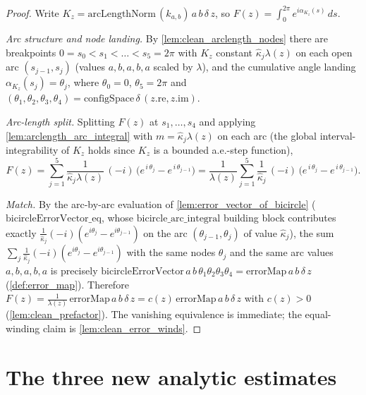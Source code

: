 \begin{proof}
  \leanok
  Write $K_z=\mathrm{arcLengthNorm}\,(k_{a,b})\,a\,b\,\delta\,z$, so
  $F(z)=\int_0^{2\pi}e^{i\alpha_{K_z}(s)}\,ds$.

  \emph{Arc structure and node landing.} By \cref{lem:clean_arclength_nodes} there
  are breakpoints $0=s_0<s_1<\dots<s_5=2\pi$ with $K_z$ constant $\hat\kappa_j\lambda(z)$
  on each open arc $(s_{j-1},s_j)$ (values $a,b,a,b,a$ scaled by $\lambda$), and the
  cumulative angle landing $\alpha_{K_z}(s_j)=\theta_j$, where $\theta_0=0$,
  $\theta_5=2\pi$ and $(\theta_1,\theta_2,\theta_3,\theta_4)=\mathrm{configSpace}\,\delta\,(z.\mathrm{re},z.\mathrm{im})$.

  \emph{Arc-length split.} Splitting $F(z)$ at $s_1,\dots,s_4$ and applying
  \cref{lem:arclength_arc_integral} with $m=\hat\kappa_j\lambda(z)$ on each arc
  (the global interval-integrability of $K_z$ holds since $K_z$ is a bounded a.e.-step
  function),
  \[
    F(z)=\sum_{j=1}^{5}\frac{1}{\hat\kappa_j\lambda(z)}\,(-i)\,
      \bigl(e^{\,i\,\theta_j}-e^{\,i\,\theta_{j-1}}\bigr)
      =\frac1{\lambda(z)}\sum_{j=1}^{5}\frac{1}{\hat\kappa_j}\,(-i)\,
      \bigl(e^{\,i\,\theta_j}-e^{\,i\,\theta_{j-1}}\bigr).
  \]

  \emph{Match.} By the arc-by-arc evaluation of \cref{lem:error_vector_of_bicircle}
  ($\mathrm{bicircleErrorVector\_eq}$, whose $\mathrm{bicircle\_arc\_integral}$
  building block contributes exactly $\tfrac1{\hat\kappa_j}(-i)(e^{i\theta_j}-e^{i\theta_{j-1}})$
  on the arc $(\theta_{j-1},\theta_j)$ of value $\hat\kappa_j$), the sum
  $\sum_{j}\tfrac{1}{\hat\kappa_j}(-i)(e^{i\theta_j}-e^{i\theta_{j-1}})$ with the same
  nodes $\theta_j$ and the same arc values $a,b,a,b,a$ is precisely
  $\mathrm{bicircleErrorVector}\,a\,b\,\theta_1\theta_2\theta_3\theta_4
   =\mathrm{errorMap}\,a\,b\,\delta\,z$ (\cref{def:error_map}). Therefore
  $F(z)=\tfrac1{\lambda(z)}\,\mathrm{errorMap}\,a\,b\,\delta\,z=c(z)\,\mathrm{errorMap}\,a\,b\,\delta\,z$
  with $c(z)>0$ (\cref{lem:clean_prefactor}). The vanishing equivalence is immediate;
  the equal-winding claim is \cref{lem:clean_error_winds}.
\end{proof}

\section{The three new analytic estimates}

